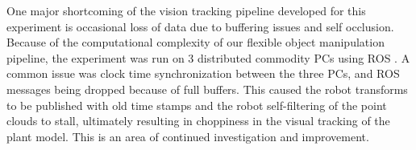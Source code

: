 \documentclass[runningheads,a4paper]{llncs}
\begin{document}
One major shortcoming of the vision tracking pipeline developed for this experiment is occasional loss of data due to buffering issues and self occlusion. Because of the computational complexity of our flexible object manipulation pipeline, the experiment was run on 3 distributed commodity PCs using ROS \cite{quigley2009ros}. A common issue was clock time synchronization between the three PCs, and ROS messages being dropped because of full buffers. This caused the robot transforms to be published with old time stamps and the robot self-filtering of the point clouds to stall, ultimately resulting in choppiness in the visual tracking of the plant model. This is an area of continued investigation and improvement. 



\end{document}
